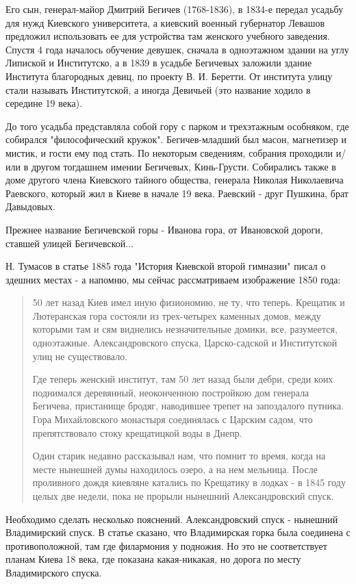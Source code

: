 Его сын, генерал-майор Дмитрий Бегичев (1768-1836), в 1834-е передал усадьбу для нужд Киевского университета, а киевский военный губернатор Левашов предложил использовать ее для устройства там женского учебного заведения. Спустя 4 года началось обучение девушек, сначала в одноэтажном здании на углу Липиской и Институтско, а в 1839 в усадьбе Бегичевых заложили здание Института благородных девиц, по проекту  В. И. Беретти. От института улицу стали называть Институтской, а иногда Девичьей (это название ходило в середине 19 века).

До того усадьба представляла собой гору с парком и трехэтажным особняком, где собирался "философический кружок". Бегичев-младший был масон, магнетизер и мистик, и гости ему под стать. По некоторым сведениям, собрания проходили и/или в другом тогдашнем имении Бегичевых, Кинь-Грусти. Собирались также в доме другого члена Киевского тайного общества, генерала Николая Николаевича Раевского, который жил в Киеве в начале 19 века. Раевский - друг Пушкина, брат Давыдовых.

Прежнее название Бегичевской горы - Иванова гора, от Ивановской дороги, ставшей улицей Бегичевской...

Н. Тумасов в статье 1885 года "История Киевской второй гимназии" писал о здешних местах - а напомню, мы сейчас рассматриваем изображение 1850 года:

\begin{quotation}

50 лет назад Киев имел иную физиономию, не ту, что теперь. Крещатик и Лютеранская гора состояли из трех-четырех каменных домов, между которыми там и сям виднелись незначительные домики, все, разумеется, одноэтажные. Александровского спуска, Царско-садской и Институтской улиц не существовало.

Где теперь женский институт, там 50 лет назад были дебри, среди коих поднимался деревянный, неоконченною постройкою дом генерала Бегичева, пристанище бродяг, наводившее трепет на запоздалого путника. Гора Михайловского монастыря соединялась с Царским садом, что препятствовало стоку крещатицкой воды в Днепр.

Один старик недавно рассказывал нам, что помнит то время, когда на месте нынешней думы находилось озеро, а на нем мельница. После проливного дождя киевляне катались по Крещатику в лодках - в 1845 году целых две недели, пока не прорыли нынешний Александровский спуск.
\end{quotation}

   Необходимо сделать несколько пояснений. Александровский спуск - нынешний Владимирский спуск. В статье сказано, что Владимирская горка была соединена с противоположной, там где филармония у подножия. Но это не соответствует планам Киева 18 века, где показана какая-никакая, но дорога по месту Владимирского спуска.

